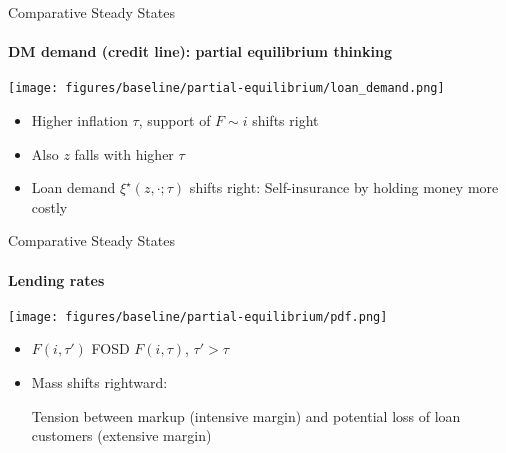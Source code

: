\documentclass[10pt,english,slidetop,compress,
              blue,mathserif,color=option]{beamer}
\theoremstyle{plain}
\theoremstyle{definition}
\begin{document}
\begin{frame}{Comparative Steady States}
  \framesubtitle{DM demand (credit line): partial equilibrium thinking}
  \begin{center}
    \texttt{[image: figures/baseline/partial-equilibrium/loan\_demand.png]}
  \end{center}

  \begin{itemize}
    \item Higher inflation $\tau$, support of $F \sim i$ shifts right

    \item Also $z$ falls with higher $\tau$


    \item Loan demand $\xi^{\star}(z,\cdot; \tau)$ shifts right: Self-insurance by holding money more costly
  \end{itemize}
\end{frame}

\begin{frame}{Comparative Steady States}
  \framesubtitle{Lending rates}
  \begin{center}
    \texttt{[image: figures/baseline/partial-equilibrium/pdf.png]}
  \end{center}
  \begin{itemize}
    \item $F(i,\tau')$ FOSD $F(i,\tau)$, $\tau' > \tau$
    \item Mass shifts rightward: 
    
    \medskip
    
    Tension between markup (intensive margin) and potential loss of loan customers (extensive margin)
  \end{itemize}
\end{frame}
\end{document}
